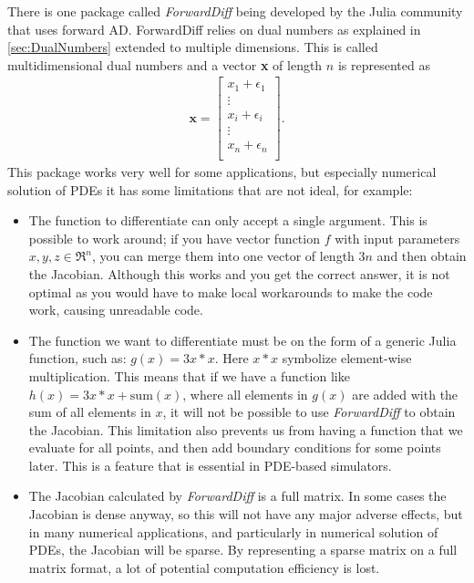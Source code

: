 There is one package called \textit{ForwardDiff} \citep{ForwardDiff} being developed by the Julia community that uses forward AD. ForwardDiff relies on dual numbers as explained in \autoref{sec:DualNumbers} extended to multiple dimensions. This is called multidimensional dual numbers and a vector \textbf{x} of length $n$ is represented as
\begin{align*}
    \textbf{x} = \begin{bmatrix}
    x_1 + \epsilon_1 \\
    \vdots \\
    x_i + \epsilon_i \\
    \vdots \\
    x_n + \epsilon_n \\
    \end{bmatrix}.
\end{align*}
 This package works very well for some applications, but especially numerical solution of PDEs it has some limitations that are not ideal, for example: 
\begin{itemize}
    \item The function to differentiate can only accept a single argument. This is possible to work around; if you have vector function $f$ with input parameters $x,y,z \in \Re^n$, you can merge them into one vector of length $3n$ and then obtain the Jacobian. Although this works and you get the correct answer, it is not optimal as you would have to make local workarounds to make the code work, causing unreadable code.
    \item The function we want to differentiate must be on the form of a generic Julia function, such as: $g(x) = 3x*x$. Here $x*x$ symbolize element-wise multiplication. This means that if we have a function like $h(x) = 3x*x + \text{sum}(x)$, where all elements in $g(x)$ are added with the sum of all elements in $x$, it will not be possible to use \textit{ForwardDiff} to obtain the Jacobian. This limitation also prevents us from having a function that we evaluate for all points, and then add boundary conditions for some points later. This is a feature that is essential in PDE-based simulators.
    \item The Jacobian calculated by \textit{ForwardDiff} is a full matrix. In some cases the Jacobian is dense anyway, so this will not have any major adverse effects, but in many numerical applications, and particularly in numerical solution of PDEs, the Jacobian will be sparse. By representing a sparse matrix on a full matrix format, a lot of potential computation efficiency is lost.
\end{itemize}

